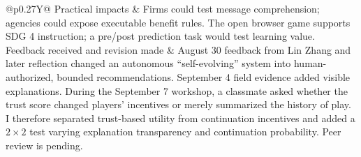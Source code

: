 \begin{table}[H]
\begin{tabularx}{\textwidth}{@{}p{}Y@{}}
Practical impacts & Firms could test message comprehension; agencies could expose executable benefit rules. The open browser game supports SDG 4 instruction; a pre/post prediction task would test learning value. \\
Feedback received and revision made & August 30 feedback from Lin Zhang and later reflection changed an autonomous ``self-evolving'' system into human-authorized, bounded recommendations. September 4 field evidence added visible explanations. During the September 7 workshop, a classmate asked whether the trust score changed players’ incentives or merely summarized the history of play. I therefore separated trust-based utility from continuation incentives and added a \(2 \times 2\) test varying explanation transparency and continuation probability. Peer review is pending. \\
\bottomrule
\end{tabularx}
\end{table}
